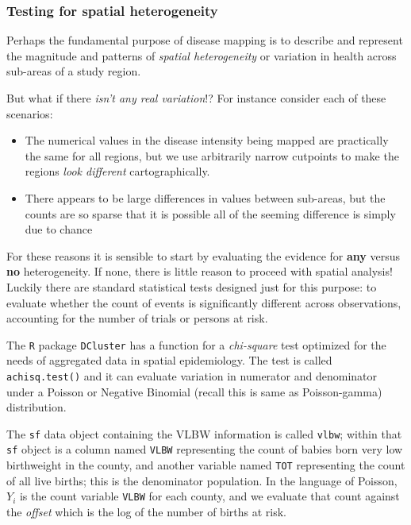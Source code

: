 \documentclass[
]{book}
\providecommand{\tightlist}{%
  \setlength{\itemsep}{0pt}\setlength{\parskip}{0pt}}
\begin{document}
\hypertarget{testing-for-spatial-heterogeneity}{%
\subsubsection{Testing for spatial heterogeneity}\label{testing-for-spatial-heterogeneity}}

Perhaps the fundamental purpose of disease mapping is to describe and represent the magnitude and patterns of \emph{spatial heterogeneity} or variation in health across sub-areas of a study region.

But what if there \emph{isn't any real variation}!? For instance consider each of these scenarios:

\begin{itemize}
\tightlist
\item
  The numerical values in the disease intensity being mapped are practically the same for all regions, but we use arbitrarily narrow cutpoints to make the regions \emph{look different} cartographically.
\item
  There appears to be large differences in values between sub-areas, but the counts are so sparse that it is possible all of the seeming difference is simply due to chance
\end{itemize}

For these reasons it is sensible to start by evaluating the evidence for \textbf{any} versus \textbf{no} heterogeneity. If none, there is little reason to proceed with spatial analysis! Luckily there are standard statistical tests designed just for this purpose: to evaluate whether the count of events is significantly different across observations, accounting for the number of trials or persons at risk.

The \texttt{R} package \texttt{DCluster} has a function for a \emph{chi-square} test optimized for the needs of aggregated data in spatial epidemiology. The test is called \texttt{achisq.test()} and it can evaluate variation in numerator and denominator under a Poisson or Negative Binomial (recall this is same as Poisson-gamma) distribution.

The \texttt{sf} data object containing the VLBW information is called \texttt{vlbw}; within that \texttt{sf} object is a column named \texttt{VLBW} representing the count of babies born very low birthweight in the county, and another variable named \texttt{TOT} representing the count of all live births; this is the denominator population. In the language of Poisson, \(Y_i\) is the count variable \texttt{VLBW} for each county, and we evaluate that count against the \emph{offset} which is the log of the number of births at risk.
\end{document}
